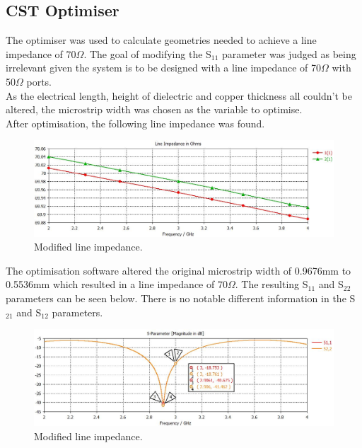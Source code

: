 \documentclass{paper}
\begin{document}
\newpage
\subsection{CST Optimiser}
\label{sec:optimise}
The optimiser was used to calculate geometries needed to achieve a line impedance of 70$\Omega$. The goal of modifying the S$_{11}$ parameter was judged as being irrelevant given the system is to be designed with a line impedance of 70$\Omega$ with 50$\Omega$ ports.\\ 

As the electrical length, height of dielectric and copper thickness all couldn't be altered, the microstrip width was chosen as the variable to optimise.\\

After optimisation, the following line impedance was found.\\

\begin{figure}[H]
	\centering
	\includegraphics[scale=0.4]{IMG/70ohm}
	\caption{Modified line impedance.}
	\label{fig:mod_line_imp}
\end{figure}

The optimisation software altered the original microstrip width of 0.9676mm to 0.5536mm which resulted in a line impedance of 70$\Omega$. The resulting S$_{11}$ and S$_{22}$ parameters can be seen below. There is no notable different information in the S$_{21}$ and S$_{12}$ parameters.

\begin{figure}[H]
	\centering
	\includegraphics[scale=0.4]{IMG/70ohm_s11_s22}
	\caption{Modified line impedance.}
	\label{fig:mod_line_s11_s22}
\end{figure}
\end{document}
